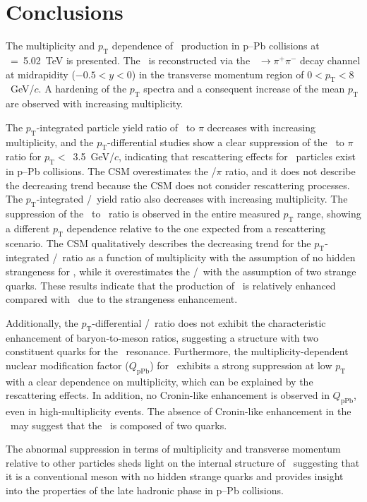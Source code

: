 
\section{Conclusions}
\label{sec:summary}

The multiplicity and $p_{\mathrm{T}}$ dependence of \fzero~production in p--Pb collisions at \snn~=~5.02~TeV is presented. The \fzero~is reconstructed via the \fzero~$\rightarrow\pi^{+}\pi^{-}$ decay channel at midrapidity ($-0.5<y<0$) in the transverse momentum region of $0<p_{\mathrm{T}}<8$~GeV/$c$. A hardening of the $p_{\mathrm{T}}$ spectra and a consequent increase of the mean $p_{\mathrm{T}}$ are observed with increasing multiplicity. 

The $p_{\mathrm{T}}$-integrated particle yield ratio of \fzero~to $\pi$ decreases with increasing multiplicity, and the $p_{\mathrm{T}}$-differential studies show a clear suppression of the \fzero~to $\pi$ ratio for $p_{\mathrm{T}}<$~3.5~GeV/$c$, indicating that rescattering effects for \fzero~particles exist in p--Pb collisions. The CSM overestimates the \fzero/$\pi$ ratio, and it does not describe the decreasing trend because the CSM does not consider rescattering processes. The $p_{\mathrm{T}}$-integrated \fzero/\kstar~yield ratio also decreases with increasing multiplicity. The suppression of the \fzero~to \kstar~ratio is observed in the entire measured $p_{\mathrm{T}}$ range, showing a different $p_{\mathrm{T}}$ dependence relative to the one expected from a rescattering scenario. The CSM qualitatively describes the decreasing trend for the $p_{\mathrm{T}}$-integrated \fzero/\kstar~ratio as a function of multiplicity with the assumption of no hidden strangeness for \fzero, while it overestimates the \fzero/\kstar~with the assumption of two strange quarks. These results indicate that the production of \kstar~is relatively enhanced compared with \fzero~due to the strangeness enhancement. 

Additionally, the $p_{\mathrm{T}}$-differential \fzero/\kstar~ratio does not exhibit the characteristic enhancement of baryon-to-meson ratios, suggesting a structure with two constituent quarks for the \fzero~resonance. Furthermore, the multiplicity-dependent nuclear modification factor ($Q_{\mbox{pPb}}$) for \fzero~exhibits a strong suppression at low $p_{\mathrm{T}}$ with a clear dependence on multiplicity, which can be explained by the rescattering effects. In addition, no Cronin-like enhancement is observed in $Q_{\mbox{pPb}}$, even in high-multiplicity events. The absence of Cronin-like enhancement in the \fzero~may suggest that the \fzero~is composed of two quarks.

The abnormal suppression in terms of multiplicity and transverse momentum relative to other particles sheds light on the internal structure of \fzero~suggesting that it is a conventional meson with no hidden strange quarks and provides insight into the properties of the late hadronic phase in p--Pb collisions.
